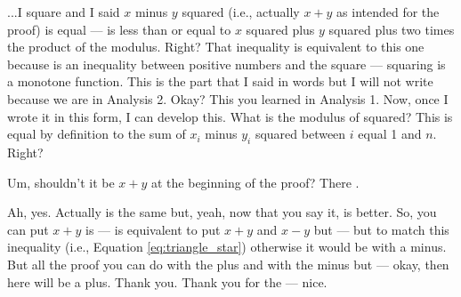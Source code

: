 \begin{spoken-clean}[00:01:24 - 00:02:15]
...I square and I said $x$ minus $y$ squared (i.e., actually $x + y$ as intended for the proof) is equal --- is less than or equal to $x$ squared plus $y$ squared plus two times the product of the modulus. Right? That inequality is equivalent to this one because is an inequality between positive numbers and the square --- squaring is a monotone function. This is the part that I said in words but I will not write because we are in Analysis 2. Okay? This you learned in Analysis 1. Now, once I wrote it in this form, I can develop this. What is the modulus of squared? This is equal by definition to the sum of $x_i$ minus $y_i$ squared between $i$ equal 1 and $n$. Right?
\end{spoken-clean}

\begin{student-interaction}
Um, shouldn't it be $x + y$ at the beginning of the proof? There .
\end{student-interaction}

\begin{spoken-clean}[continued]
Ah, yes. Actually is the same but, yeah, now that you say it, is better. So, you can put $x + y$ is --- is equivalent to put $x + y$ and $x - y$ but --- but to match this inequality (i.e., Equation \ref{eq:triangle_star}) otherwise it would be with a minus. But all the proof you can do with the plus and with the minus but --- okay, then here will be a plus. Thank you. Thank you for the --- nice. 
\end{spoken-clean}

